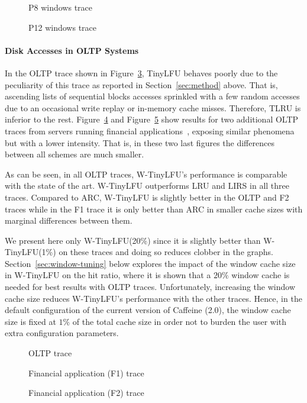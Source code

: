 \documentclass[10pt,a4paper]{article}
\begin{document}
\begin{figure}[t]
	\caption{P8 windows trace}
	\label{fig:P8}
\end{figure}
\begin{figure}[t]
	\caption{P12 windows trace}
	\label{fig:P12}
\end{figure}


\paragraph*{Disk Accesses in OLTP Systems}
In the OLTP trace shown in Figure~\ref{fig:oltp}, TinyLFU behaves poorly due to the peculiarity of this trace as reported in Section~\ref{sec:method} above.
That is, ascending lists of sequential blocks accesses sprinkled with a few random accesses due to an occasional write replay or in-memory cache misses.
Therefore, TLRU is inferior to the rest.
Figure~\ref{fig:F1} and Figure~\ref{fig:F2} show results for two additional OLTP traces from servers running financial applications~\cite{UMAS}, exposing similar phenomena but with a lower intensity.
That is, in these two last figures the differences between all schemes are much smaller.

As can be seen, in all OLTP traces, W-TinyLFU's performance is comparable with the state of the art.
W-TinyLFU outperforms LRU and LIRS in all three traces.
Compared to ARC, W-TinyLFU is slightly better in the OLTP and F2 traces while in the F1 trace it is only better than ARC in smaller cache sizes with marginal differences between them.

We present here only W-TinyLFU(20\%) since it is slightly better than W-TinyLFU(1\%) on these traces and doing so reduces clobber in the graphs.
Section~\ref{sec:window-tuning} below explores the impact of the window cache size in W-TinyLFU on the hit ratio, where it is shown that a $20\%$ window cache is needed for best results with OLTP traces.
Unfortunately, increasing the window cache size reduces W-TinyLFU's performance with the other traces.
Hence, in the default configuration of the current version of Caffeine (2.0), the window cache size is fixed at $1\%$ of the total cache size in order not to burden the user with extra configuration parameters.

\begin{figure}[t]
	\caption{OLTP trace}
	\label{fig:oltp}
\end{figure}
\begin{figure}[t]
	\caption{Financial application (F1) trace}
	\label{fig:F1}
\end{figure}
\begin{figure}[t]
	\caption{Financial application (F2) trace}
	\label{fig:F2}
\end{figure}
\end{document}
